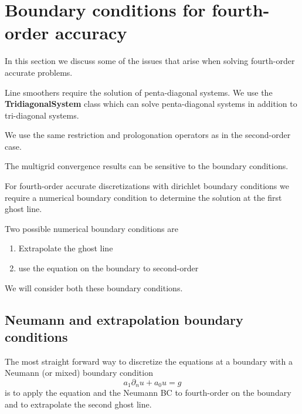 \section{Boundary conditions for fourth-order accuracy}
  

  In this section we discuss some of the issues that arise when solving fourth-order accurate
problems.

Line smoothers require the solution of penta-diagonal systems. We use the {\bf TridiagonalSystem} class
which can solve penta-diagonal systems in addition to tri-diagonal systems.

We use the same restriction and prologonation operators as in the second-order case.


  The multigrid convergence results can be sensitive to the boundary conditions.

For fourth-order accurate discretizations with dirichlet boundary conditions we require
a numerical boundary condition to determine the solution at the first ghost line.

Two possible numerical boundary conditions are
\begin{enumerate}
   \item Extrapolate the ghost line
   \item use the equation on the boundary to second-order
\end{enumerate}
We will consider both these boundary conditions. 
  


\subsection{Neumann and extrapolation boundary conditions}

The most straight forward way to discretize the equations at a boundary with a 
Neumann (or mixed) boundary condition 
\[
   a_1 \partial_n u + a_0 u = g
\]
is to apply the equation and the
Neumann BC to fourth-order on the boundary and to extrapolate the second ghost line.

